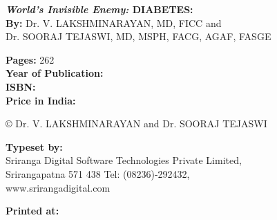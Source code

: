 \thispagestyle{empty}

\noindent\textbf{\textit{World's Invisible Enemy:} DIABETES:}\\
\textbf{By:} Dr. V. LAKSHMINARAYAN, MD, FICC and\\
Dr. SOORAJ TEJASWI, MD, MSPH, FACG, AGAF, FASGE
 
 \vfill
 
 \noindent
\textbf{Pages:} 262\\
\textbf{Year of Publication:} \\
 \textbf{ISBN:} \\
\textbf{ Price in India:} \rupee 


 \vfill
 
\noindent © Dr. V. LAKSHMINARAYAN and Dr. SOORAJ TEJASWI
 
  \vfill
  
\noindent
\textbf{Typeset by:}\\
Sriranga Digital Software Technologies Private Limited,\\
Srirangapatna 571 438 Tel: (08236)-292432,\\
www.srirangadigital.com\\

 \vfill

\noindent
\textbf{Printed at:}







